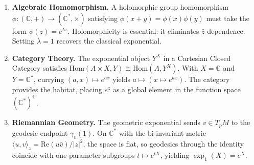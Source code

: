 {\begin{enumerate}[leftmargin=*,itemsep=6pt]
    \item \textbf{Algebraic Homomorphism.}
    A holomorphic group homomorphism \( \phi \colon (\mathbb{C},+) \to (\mathbb{C}^*,\times) \) satisfying \( \phi(x+y) = \phi(x)\phi(y) \) must take the form \( \phi(z) = e^{\lambda z} \). Holomorphicity is essential: it eliminates \( \bar{z} \) dependence. Setting \( \lambda = 1 \) recovers the classical exponential.

    \item \textbf{Category Theory.}
    The exponential object \( Y^X \) in a Cartesian Closed Category satisfies \( \mathrm{Hom}(A \times X,Y) \cong \mathrm{Hom}(A,Y^X) \). With \( X = \mathbb{C} \) and \( Y = \mathbb{C}^* \), currying \( (a,x) \mapsto e^{ax} \) yields \( a \mapsto (x \mapsto e^{ax}) \). The category provides the habitat, placing \( e^z \) as a global element in the function space \( (\mathbb{C}^*)^{\mathbb{C}} \).

    \item \textbf{Riemannian Geometry.}
    The geometric exponential sends \( v \in T_pM \) to the geodesic endpoint \( \gamma_v(1) \). On \( \mathbb{C}^* \) with the bi-invariant metric \( \langle u,v\rangle_z = \mathrm{Re}(u\bar{v})/|z|^2 \), the space is flat, so geodesics through the identity coincide with one-parameter subgroups \( t \mapsto e^{tX} \), yielding \( \exp_1(X) = e^X \).

\end{enumerate}
}
